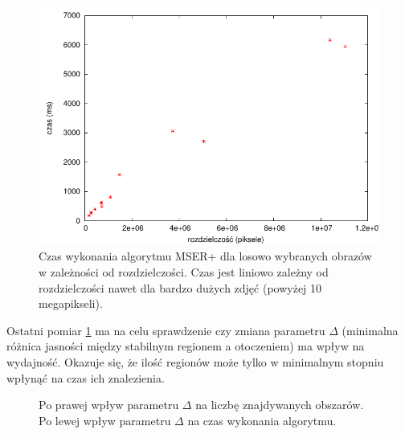 \begin{figure}[h!] \centering \includegraphics{images/random.pdf}
\caption{Czas wykonania algorytmu MSER+ dla losowo wybranych obrazów w
zależności od rozdzielczości. Czas jest liniowo zależny od rozdzielczości nawet
dla bardzo dużych zdjęć (powyżej 10 megapikseli).} \end{figure}

Ostatni pomiar \ref{delta} ma na celu sprawdzenie czy zmiana parametru $\Delta$
(minimalna różnica jasności między stabilnym regionem a otoczeniem) ma wpływ na
wydajność. Okazuje się, że ilość regionów może tylko w minimalnym stopniu
wpłynąć na czas ich znalezienia.

\begin{figure} \centering
  \caption{Po prawej wpływ parametru $\Delta$ na liczbę znajdywanych obszarów.
  Po lewej wpływ parametru $\Delta$ na czas wykonania algorytmu.} \label{delta}
\end{figure}

